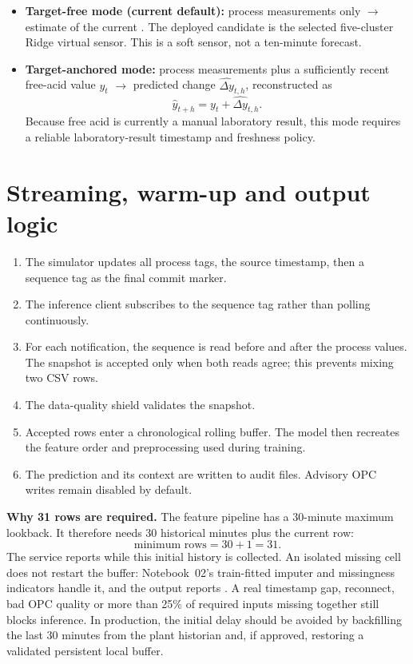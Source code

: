 \documentclass[11pt,a4paper]{article}
\newcommand{\code}[1]{\texttt{\detokenize{#1}}}
\begin{document}
\begin{itemize}
  \item \textbf{Target-free mode (current default):} process measurements only $\rightarrow$ estimate of the current \code{SLURRY_FREE_ACID}. The deployed candidate is the selected five-cluster Ridge virtual sensor. This is a soft sensor, not a ten-minute forecast.
  \item \textbf{Target-anchored mode:} process measurements plus a sufficiently recent free-acid value $y_t$ $\rightarrow$ predicted change $\widehat{\Delta y}_{t,h}$, reconstructed as
  \[
     \widehat y_{t+h}=y_t+\widehat{\Delta y}_{t,h}.
  \]
  Because free acid is currently a manual laboratory result, this mode requires a reliable laboratory-result timestamp and freshness policy.
\end{itemize}

\section{Streaming, warm-up and output logic}

\begin{enumerate}
  \item The simulator updates all process tags, the source timestamp, then a sequence tag as the final commit marker.
  \item The inference client subscribes to the sequence tag rather than polling continuously.
  \item For each notification, the sequence is read before and after the process values. The snapshot is accepted only when both reads agree; this prevents mixing two CSV rows.
  \item The data-quality shield validates the snapshot.
  \item Accepted rows enter a chronological rolling buffer. The model then recreates the feature order and preprocessing used during training.
  \item The prediction and its context are written to audit files. Advisory OPC writes remain disabled by default.
\end{enumerate}

\textbf{Why 31 rows are required.} The feature pipeline has a 30-minute maximum lookback. It therefore needs 30 historical minutes plus the current row:
\[
\text{minimum rows}=30+1=31.
\]
The service reports \code{WARMING_UP} while this initial history is collected. An isolated missing cell does not restart the buffer: Notebook~02's train-fitted imputer and missingness indicators handle it, and the output reports \code{IMPUTED}. A real timestamp gap, reconnect, bad OPC quality or more than 25\% of required inputs missing together still blocks inference. In production, the initial delay should be avoided by backfilling the last 30 minutes from the plant historian and, if approved, restoring a validated persistent local buffer.
\end{document}
